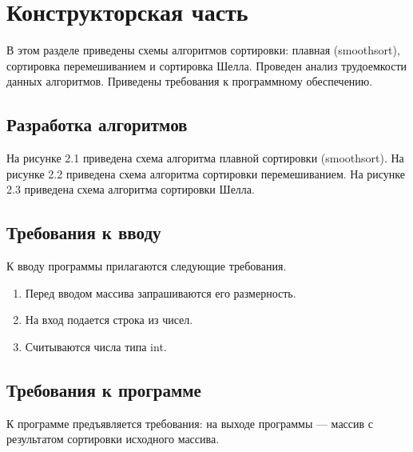 \chapter{Конструкторская часть}
В этом разделе приведены схемы алгоритмов сортировки: плавная (smoothsort), сортировка перемешиванием и сортировка Шелла. Проведен анализ трудоемкости данных алгоритмов. Приведены требования к программному обеспечению.

\section{Разработка алгоритмов}

На рисунке 2.1 приведена схема алгоритма плавной сортировки (smoothsort).
На рисунке 2.2 приведена схема алгоритма сортировки перемешиванием.
На рисунке 2.3 приведена схема алгоритма сортировки Шелла.



\newpage
\section{Требования к вводу}
К вводу программы прилагаются следующие требования.
\begin{enumerate}
	\item Перед вводом массива запрашиваются его размерность.
	\item На вход подается строка из чисел.
	\item Считываются числа типа int.
\end{enumerate}

\section{Требования к программе}
К программе предъявляется требования:
на выходе программы — массив с результатом сортировки исходного массива.

